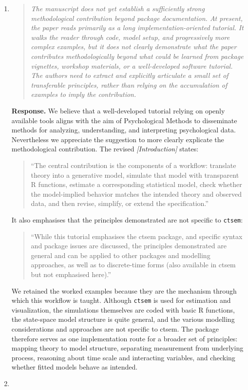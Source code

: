 \documentclass[11pt]{article}
\newcommand{\response}{\textbf{Response.} }
\newcommand{\secit}[1]{\textit{[#1]}}
\newcommand{\msq}[1]{\begin{quote}\small\noindent``#1''\end{quote}}
\newenvironment{reviewerpoint}{\begin{quote}\itshape}{\end{quote}}
\begin{document}
\begin{enumerate}[label=\textbf{Reviewer 2, Main Concern \arabic*.}]

\item

\begin{reviewerpoint}
The manuscript does not yet establish a sufficiently strong methodological contribution beyond package documentation.
At present, the paper reads primarily as a long implementation-oriented tutorial. It walks the reader through code, model setup, and progressively more complex examples, but it does not clearly demonstrate what the paper contributes methodologically beyond what could be learned from package vignettes, workshop materials, or a well-developed software tutorial. The authors need to extract and explicitly articulate a small set of transferable principles, rather than relying on the accumulation of examples to imply the contribution.
\end{reviewerpoint}

\response We believe that a well-developed tutorial relying on openly available tools aligns with the aim of Psychological Methods to disseminate methods for analyzing, understanding, and interpreting psychological data.
Nevertheless we appreciate the suggestion to more clearly explicate the methodological contribution.
The revised \secit{Introduction} states:
\msq{The central contribution is the components of a workflow: translate theory into a generative model, simulate that model with transparent R functions, estimate a corresponding statistical model, check whether the model-implied behavior matches the intended theory and observed data, and then revise, simplify, or extend the specification.}
It also emphasises that the principles demonstrated are not specific to \texttt{ctsem}:
\msq{While this tutorial emphasises the ctsem package, and specific syntax and package issues are discussed, the principles demonstrated are general and can be applied to other packages and modelling approaches, as well as to discrete-time forms (also available in ctsem but not emphasised here).}

We retained the worked examples because they are the mechanism through which this workflow is taught.
Although \texttt{ctsem} is used for estimation and visualization, the simulations themselves are coded with basic R functions, the state-space model structure is quite general, and the various modelling considerations and approaches are not specific to ctsem.
The package therefore serves as one implementation route for a broader set of principles: mapping theory to model structure, separating measurement from underlying process, reasoning about time scale and interacting variables, and checking whether fitted models behave as intended.
\item


\end{enumerate}
\end{document}
